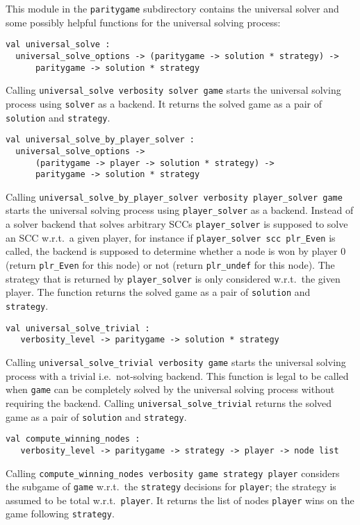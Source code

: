 This module in the \texttt{paritygame} subdirectory contains the universal solver and some possibly helpful functions
for the universal solving process:
\begin{description}
\itemsep3mm

\item
\begin{verbatim}
val universal_solve :
  universal_solve_options -> (paritygame -> solution * strategy) ->
      paritygame -> solution * strategy
\end{verbatim}
Calling \verb+universal_solve verbosity solver game+ starts the universal solving process using \verb+solver+ as a
backend. It returns the solved game as a pair of \verb+solution+ and \verb+strategy+.

\item
\begin{verbatim}
val universal_solve_by_player_solver :
  universal_solve_options ->
      (paritygame -> player -> solution * strategy) ->
      paritygame -> solution * strategy
\end{verbatim}
Calling \verb+universal_solve_by_player_solver verbosity player_solver game+ \linebreak starts the universal
solving process using \verb+player_solver+ as a backend. Instead of a solver backend that solves arbitrary SCCs
\verb+player_solver+ is supposed to solve an SCC w.r.t.\ a given player, for instance if \verb+player_solver scc plr_Even+
is called, the backend is supposed to determine whether a node is won by player $0$ (return \verb#plr_Even# for this node) or
not (return \verb#plr_undef# for this node). The strategy that is returned by \verb+player_solver+ is only considered w.r.t.\
the given player. The function returns the solved game as a pair of \verb+solution+ and \verb+strategy+.

\item
\begin{verbatim}
val universal_solve_trivial :
   verbosity_level -> paritygame -> solution * strategy
\end{verbatim}
Calling \verb+universal_solve_trivial verbosity game+ starts the universal solving process with a trivial i.e.\
not-solving backend. This function is legal to be called when \verb+game+ can be completely solved by the universal
solving process without requiring the backend. Calling \verb+universal_solve_trivial+ returns the solved game as a
pair of \verb+solution+ and \verb+strategy+.

\item
\begin{verbatim}
val compute_winning_nodes :
   verbosity_level -> paritygame -> strategy -> player -> node list
\end{verbatim}
Calling \verb+compute_winning_nodes verbosity game strategy player+ considers \linebreak the subgame of \verb+game+ w.r.t.\
the \verb+strategy+ decisions for \verb+player+; the strategy is assumed to be total w.r.t.\ \verb+player+. It
returns the list of nodes \verb+player+ wins on the game following \verb+strategy+.
\end{description}
